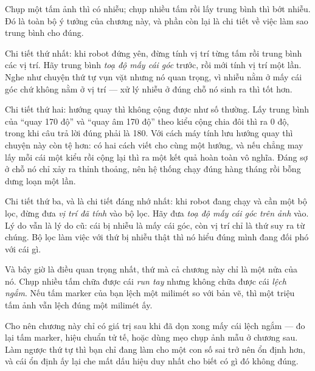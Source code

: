\documentclass[../../marker.tex]{subfiles}
\begin{document}
\begin{dongian}
Chụp một tấm ảnh thì có nhiễu; chụp nhiều tấm rồi lấy trung bình thì bớt nhiễu. Đó là toàn bộ ý tưởng của chương này, và phần còn lại là chi tiết về việc làm sao trung bình cho đúng.

Chi tiết thứ nhất: khi robot đứng yên, đừng tính vị trí từng tấm rồi trung bình các vị trí. Hãy trung bình \emph{toạ độ mấy cái góc} trước, rồi mới tính vị trí một lần. Nghe như chuyện thứ tự vụn vặt nhưng nó quan trọng, vì nhiễu nằm ở mấy cái góc chứ không nằm ở vị trí --- xử lý nhiễu ở đúng chỗ nó sinh ra thì tốt hơn.

Chi tiết thứ hai: hướng quay thì không cộng được như số thường. Lấy trung bình của ``quay 170 độ'' và ``quay âm 170 độ'' theo kiểu cộng chia đôi thì ra 0 độ, trong khi câu trả lời đúng phải là 180. Với cách máy tính lưu hướng quay thì chuyện này còn tệ hơn: có hai cách viết cho cùng một hướng, và nếu chẳng may lấy mỗi cái một kiểu rồi cộng lại thì ra một kết quả hoàn toàn vô nghĩa. Đáng sợ ở chỗ nó chỉ xảy ra thỉnh thoảng, nên hệ thống chạy đúng hàng tháng rồi bỗng dưng loạn một lần.

Chi tiết thứ ba, và là chi tiết đáng nhớ nhất: khi robot đang chạy và cần một bộ lọc, đừng đưa \emph{vị trí đã tính} vào bộ lọc. Hãy đưa \emph{toạ độ mấy cái góc trên ảnh} vào. Lý do vẫn là lý do cũ: cái bị nhiễu là mấy cái góc, còn vị trí chỉ là thứ suy ra từ chúng. Bộ lọc làm việc với thứ bị nhiễu thật thì nó hiểu đúng mình đang đối phó với cái gì.

Và bây giờ là điều quan trọng nhất, thứ mà cả chương này chỉ là một nửa của nó. Chụp nhiều tấm chữa được cái \emph{run tay} nhưng không chữa được cái \emph{lệch ngắm}. Nếu tấm marker của bạn lệch một milimét so với bản vẽ, thì một triệu tấm ảnh vẫn lệch đúng một milimét ấy.

Cho nên chương này chỉ có giá trị sau khi đã dọn xong mấy cái lệch ngắm --- đo lại tấm marker, hiệu chuẩn tử tế, hoặc dùng mẹo chụp ảnh mẫu ở chương sau. Làm ngược thứ tự thì bạn chỉ đang làm cho một con số sai trở nên ổn định hơn, và cái ổn định ấy lại che mất dấu hiệu duy nhất cho biết có gì đó không đúng.

\end{dongian}
\end{document}
